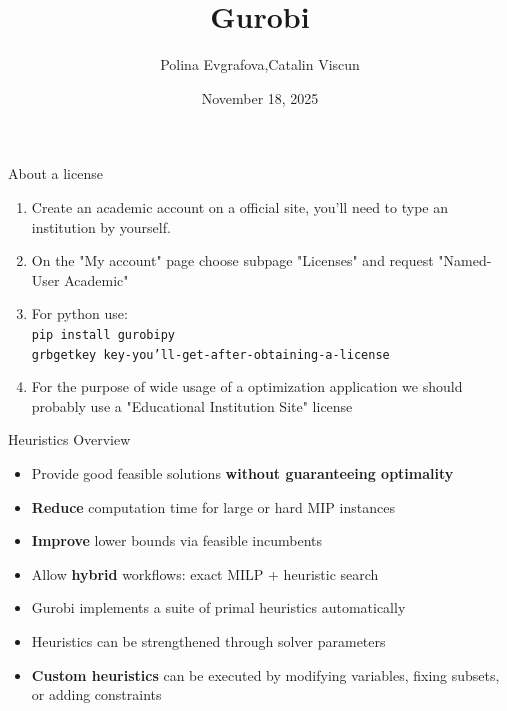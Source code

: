 \documentclass[10pt]{beamer}
\begin{document}
\title{Gurobi}
\author{Polina Evgrafova,Catalin Viscun}
\date{November 18, 2025}

\begin{frame}
    \maketitle
\end{frame}
\begin{frame}{About a license}
    \begin{enumerate}\Large\textbf{How to install gurobi}\normalsize
        \item Create an academic account on a official site, you'll need to type an institution by yourself.
        \item On the "My account" page choose subpage "Licenses" and request "Named-User Academic"
        \item For python use:
        \\ \texttt{pip install gurobipy}
        \\ \texttt{grbgetkey key-you'll-get-after-obtaining-a-license}
        \item For the purpose of wide usage of a optimization application we should probably use a "Educational Institution Site" license
    \end{enumerate}
    
\end{frame}



\begin{frame}{Heuristics Overview}
    \begin{itemize}\Large\textbf{What heuristics achieve}\normalsize
        \item Provide good feasible solutions \textbf{without guaranteeing optimality}
        \item \textbf{Reduce} computation time for large or hard MIP instances
        \item \textbf{Improve} lower bounds via feasible incumbents
        \item Allow \textbf{hybrid} workflows: exact MILP + heuristic search
    \end{itemize}

    \bigskip
    \begin{itemize}\Large\textbf{Gurobi's role}\normalsize
        \item Gurobi implements a suite of primal heuristics automatically
        \item Heuristics can be strengthened through solver parameters
        \item \textbf{Custom heuristics} can be executed by modifying variables, fixing subsets, or adding constraints
    \end{itemize}
\end{frame}
\end{document}

